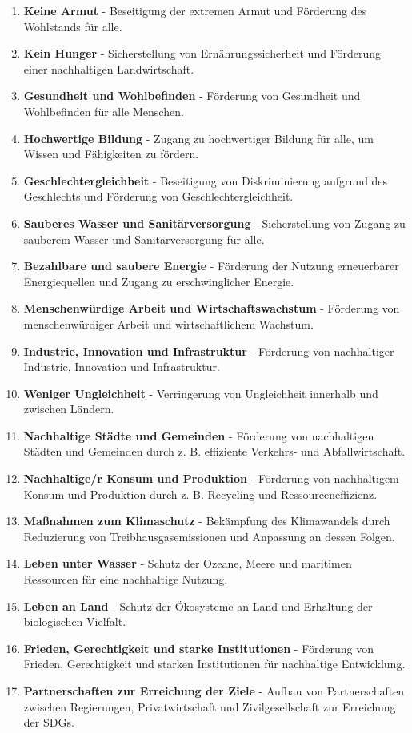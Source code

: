 \begin{enumerate}
    \item \textbf{Keine Armut} - Beseitigung der extremen Armut und Förderung des Wohlstands für alle.
    \item \textbf{Kein Hunger} - Sicherstellung von Ernährungssicherheit und Förderung einer nachhaltigen Landwirtschaft.
    \item \textbf{Gesundheit und Wohlbefinden} - Förderung von Gesundheit und Wohlbefinden für alle Menschen.
    \item \textbf{Hochwertige Bildung} - Zugang zu hochwertiger Bildung für alle, um Wissen und Fähigkeiten zu fördern.
    \item \textbf{Geschlechtergleichheit} - Beseitigung von Diskriminierung aufgrund des Geschlechts und Förderung von Geschlechtergleichheit.
    \item \textbf{Sauberes Wasser und Sanitärversorgung} - Sicherstellung von Zugang zu sauberem Wasser und Sanitärversorgung für alle.
    \item \textbf{Bezahlbare und saubere Energie} - Förderung der Nutzung erneuerbarer Energiequellen und Zugang zu erschwinglicher Energie.
    \item \textbf{Menschenwürdige Arbeit und Wirtschaftswachstum} - Förderung von menschenwürdiger Arbeit und wirtschaftlichem Wachstum.
    \item \textbf{Industrie, Innovation und Infrastruktur} - Förderung von nachhaltiger Industrie, Innovation und Infrastruktur.
    \item \textbf{Weniger Ungleichheit} - Verringerung von Ungleichheit innerhalb und zwischen Ländern.
    \item \textbf{Nachhaltige Städte und Gemeinden} - Förderung von nachhaltigen Städten und Gemeinden durch z. B. effiziente Verkehrs- und Abfallwirtschaft.
    \item \textbf{Nachhaltige/r Konsum und Produktion} - Förderung von nachhaltigem Konsum und Produktion durch z. B. Recycling und Ressourceneffizienz.
    \item \textbf{Maßnahmen zum Klimaschutz} - Bekämpfung des Klimawandels durch Reduzierung von Treibhausgasemissionen und Anpassung an dessen Folgen.
    \item \textbf{Leben unter Wasser} - Schutz der Ozeane, Meere und maritimen Ressourcen für eine nachhaltige Nutzung.
    \item \textbf{Leben an Land} - Schutz der Ökosysteme an Land und Erhaltung der biologischen Vielfalt.
    \item \textbf{Frieden, Gerechtigkeit und starke Institutionen} - Förderung von Frieden, Gerechtigkeit und starken Institutionen für nachhaltige Entwicklung.
    \item \textbf{Partnerschaften zur Erreichung der Ziele} - Aufbau von Partnerschaften zwischen Regierungen, Privatwirtschaft und Zivilgesellschaft zur Erreichung der SDGs.
\end{enumerate}


